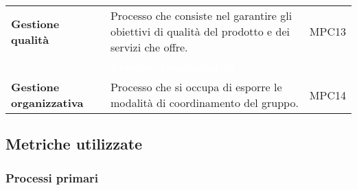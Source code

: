 {\begin{longtable}{C{3cm} | C{9.5cm} | C{2.5cm}}
	\textbf{Gestione qualità} &
	 Processo che consiste nel garantire gli obiettivi di qualità del prodotto e dei servizi che offre. &
	MPC13 \\
	
 & \textcolor{white}{\textbf{Processi Organizzativi}} &  \\
 
	\textbf{Gestione organizzativa} & 
	Processo che si occupa di esporre le modalità di coordinamento del gruppo. &
	MPC14 \\
	
\end{longtable}	

}

\newpage

\subsection{Metriche utilizzate}


\subsubsection{Processi primari}

